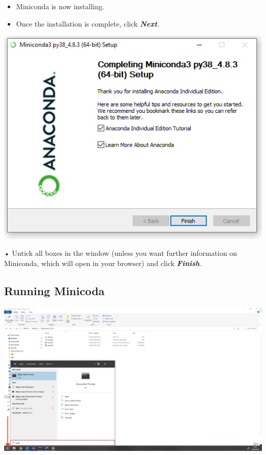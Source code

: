 \documentclass[
]{book}
\providecommand{\tightlist}{%
  \setlength{\itemsep}{0pt}\setlength{\parskip}{0pt}}
\begin{document}
\begin{itemize}
\tightlist
\item
  Miniconda is now installing.
\item
  Once the installation is complete, click \textbf{\emph{Next}}.
\end{itemize}

\begin{center}\includegraphics[width=7.15in]{figs/chp4/Inst_7} \end{center}

• Untick all boxes in the window (unless you want further information on Miniconda, which will open in your browser) and click \textbf{\emph{Finish}}.

\hypertarget{running-minicoda}{%
\subsection*{Running Minicoda}\label{running-minicoda}}

\begin{center}\includegraphics[width=29.86in]{figs/chp4/Picture20} \end{center}
\end{document}

